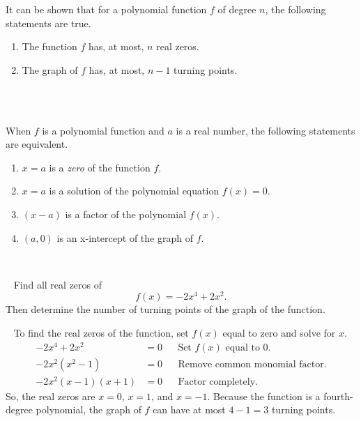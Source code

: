 It can be shown that for a polynomial function $f$ of degree $n$, the following statements are true. \cite{ci}
\begin{enumerate}
    \item The function $f$ has, at most, $n$ real zeros. 
    \item The graph of $f$ has, at most, $n-1$ turning points.
\end{enumerate}
~\\
\begin{proposition}\cite{ci}
    ~\\
    When $f$ is a polynomial function and $a$ is a real number, the following statements are equivalent.
    \begin{enumerate}
        \item $x=a$ is a \textit{zero} of the function $f$.
        \item $x=a$ is a solution of the polynomial equation $f(x)=0$. 
        \item $(x-a)$ is a factor of the polynomial $f(x)$.
        \item $(a,0)$ is an x-intercept of the graph of $f$.
    \end{enumerate}
\end{proposition}
~\\
\begin{example}\cite{ci}~\newline
    Find all real zeros of
    $$f(x)=-2x^4+2x^2.$$
    Then determine the number of turning points of the graph of the function.\\
    \begin{solution}~\newline
        To find the real zeros of the function, set $f(x)$ equal to zero and solve for $x$.
        \begin{align*}
            -2x^4+2x^2      & = 0   && \text{Set $f(x)$ equal to 0.}\\
            -2x^2(x^2-1)    & = 0   && \text{Remove common monomial factor.}\\
            -2x^2(x-1)(x+1) & = 0   && \text{Factor completely.}
        \end{align*}
        So, the real zeros are $x = 0$, $x = 1$, and $x = -1$. Because the function is a fourth-degree polynomial, the graph of $f$ can have at most $4 - 1 = 3$ turning points.\\
	\end{solution}
\end{example}

